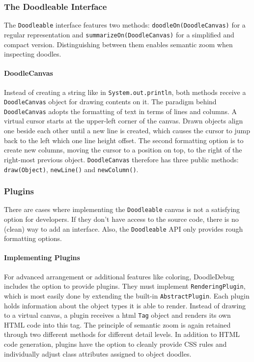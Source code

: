 \documentclass[english]{scrartcl}
\newcommand{\nb}[2]{\nbc{#1}{#2}{orange}}
\newcommand\todo[1]{\nb{TO DO}{#1}}
\newcommand{\DD}{Dood\-le\-De\-bug\xspace}
\newcommand{\println}{\texttt{Sys\-tem.\-out.\-println}\xspace}
\begin{document}
\subsubsection{The Doodleable Interface}

The \texttt{Doodleable} interface features two methods: \texttt{doodleOn(DoodleCanvas)} for a regular representation and \texttt{summarizeOn(DoodleCanvas)} for a simplified and compact version.
Distinguishing between them enables semantic zoom \cite{semantic-zoom} when inspecting doodles.

\paragraph{DoodleCanvas}
Instead of creating a string like in \println, both methods receive a \texttt{DoodleCanvas} object for drawing contents on it.
The paradigm behind \texttt{DoodleCanvas} adopts the formatting of text in terms of lines and columns.
A virtual cursor starts at the upper-left corner of the canvas.
Drawn objects align one beside each other until a new line is created, which causes the cursor to jump back to the left which one line height offset.
The second formatting option is to create new columns, moving the cursor to a position on top, to the right of the right-most previous object.
\texttt{DoodleCanvas} therefore has three public methods: \texttt{draw(Object)}, \texttt{newLine()} and \texttt{newColumn()}.

\todo{Image here}

\subsubsection{Plugins}
There are cases where implementing the \texttt{Doodleable} canvas is not a satisfying option for developers.
If they don't have access to the source code, there is no (clean) way to add an interface.
Also, the \texttt{Doodleable} API only provides rough formatting options.

\paragraph{Implementing Plugins}
For advanced arrangement or additional features like coloring, \DD includes the option to provide plugins.
They must implement \texttt{RenderingPlugin}, which is most easily done by extending the built-in \texttt{AbstractPlugin}.
Each plugin holds information about the object types it is able to render.
Instead of drawing to a virtual canvas, a plugin receives a html \texttt{Tag} object and renders its own HTML code into this tag.
The principle of semantic zoom is again retained through two different methods for different detail levels.
In addition to HTML code generation, plugins have the option to cleanly provide CSS rules and individually adjust class attributes assigned to object doodles.
\end{document}
